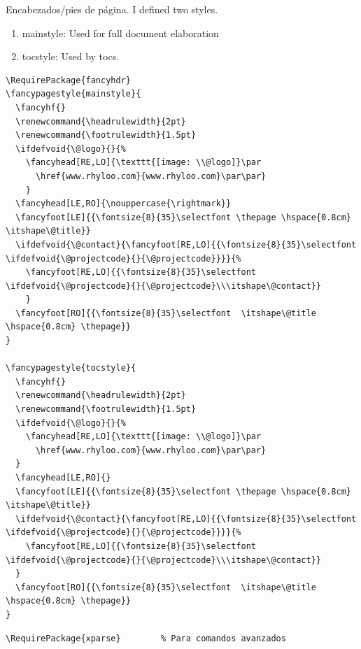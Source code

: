 \documentclass[english]{reporti}
\begin{document}
Encabezados/pies de página. I defined two styles.
\begin{enumerate}
\item mainstyle: Used for full document elaboration
\item tocstyle: Used by tocs.
\end{enumerate}
\begin{verbatim}
\RequirePackage{fancyhdr}      
\fancypagestyle{mainstyle}{
  \fancyhf{}
  \renewcommand{\headrulewidth}{2pt}
  \renewcommand{\footrulewidth}{1.5pt}
  \ifdefvoid{\@logo}{}{%
    \fancyhead[RE,LO]{\texttt{[image: \\@logo]}\par
      \href{www.rhyloo.com}{www.rhyloo.com}\par\par}
    }
  \fancyhead[LE,RO]{\nouppercase{\rightmark}}
  \fancyfoot[LE]{{\fontsize{8}{35}\selectfont \thepage \hspace{0.8cm} \itshape\@title}}
  \ifdefvoid{\@contact}{\fancyfoot[RE,LO]{{\fontsize{8}{35}\selectfont \ifdefvoid{\@projectcode}{}{\@projectcode}}}}{%
    \fancyfoot[RE,LO]{{\fontsize{8}{35}\selectfont \ifdefvoid{\@projectcode}{}{\@projectcode}\\\itshape\@contact}}
    }
  \fancyfoot[RO]{{\fontsize{8}{35}\selectfont  \itshape\@title \hspace{0.8cm} \thepage}}
}

\fancypagestyle{tocstyle}{
  \fancyhf{}
  \renewcommand{\headrulewidth}{2pt}
  \renewcommand{\footrulewidth}{1.5pt}
  \ifdefvoid{\@logo}{}{%
    \fancyhead[RE,LO]{\texttt{[image: \\@logo]}\par
      \href{www.rhyloo.com}{www.rhyloo.com}\par\par}
  }
  \fancyhead[LE,RO]{}
  \fancyfoot[LE]{{\fontsize{8}{35}\selectfont \thepage \hspace{0.8cm} \itshape\@title}}
  \ifdefvoid{\@contact}{\fancyfoot[RE,LO]{{\fontsize{8}{35}\selectfont \ifdefvoid{\@projectcode}{}{\@projectcode}}}}{%
    \fancyfoot[RE,LO]{{\fontsize{8}{35}\selectfont \ifdefvoid{\@projectcode}{}{\@projectcode}\\\itshape\@contact}}
  }
  \fancyfoot[RO]{{\fontsize{8}{35}\selectfont  \itshape\@title \hspace{0.8cm} \thepage}}
}

\end{verbatim}

\begin{verbatim}
\RequirePackage{xparse}        % Para comandos avanzados
\end{verbatim}
\end{document}
